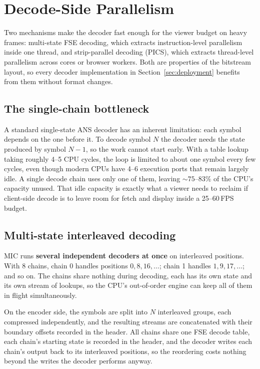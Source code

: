 \documentclass[journal]{IEEEtran}
\begin{document}
\section{Decode-Side Parallelism}
\label{sec:parallel}

Two mechanisms make the decoder fast enough for the viewer budget on heavy
frames: multi-state FSE decoding, which extracts instruction-level
parallelism inside one thread, and strip-parallel decoding (PICS), which
extracts thread-level parallelism across cores or browser workers. Both are
properties of the bitstream layout, so every decoder implementation in
Section~\ref{sec:deployment} benefits from them without format changes.

\subsection{The single-chain bottleneck}

A standard single-state ANS decoder has an inherent limitation: each symbol
depends on the one before it. To decode symbol $N$ the decoder needs the
state produced by symbol $N-1$, so the work cannot start early. With a table
lookup taking roughly 4--5 CPU cycles, the loop is limited to about one
symbol every few cycles, even though modern CPUs have 4--6 execution ports
that remain largely idle. A single decode chain uses only one of them,
leaving ${\sim}75$--83\% of the CPU's capacity unused. That idle capacity is
exactly what a viewer needs to reclaim if client-side decode is to leave room
for fetch and display inside a 25--60\,FPS budget.

\subsection{Multi-state interleaved decoding}

MIC runs \textbf{several independent decoders at once} on interleaved
positions. With 8 chains, chain 0 handles positions $0, 8, 16, \ldots$;
chain 1 handles $1, 9, 17, \ldots$; and so on. The chains share nothing
during decoding, each has its own state and its own stream of lookups, so the
CPU's out-of-order engine can keep all of them in flight simultaneously.

On the encoder side, the symbols are split into $N$ interleaved groups, each
compressed independently, and the resulting streams are concatenated with
their boundary offsets recorded in the header. All chains share one FSE
decode table, each chain's starting state is recorded in the header, and the
decoder writes each chain's output back to its interleaved positions, so the
reordering costs nothing beyond the writes the decoder performs anyway.
\end{document}

